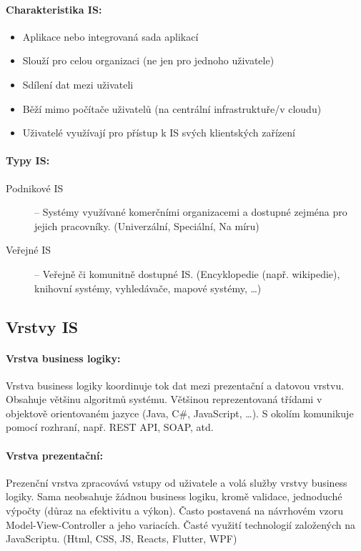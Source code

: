 \paragraph*{Charakteristika IS:}
\begin{itemize}
    \item Aplikace nebo integrovaná sada aplikací
    \item Slouží pro celou organizaci (ne jen pro jednoho uživatele)
    \item Sdílení dat mezi uživateli
    \item Běží mimo počítače uživatelů (na centrální infrastruktuře/v cloudu)
    \item Uživatelé využívají pro přístup k IS svých klientských zařízení
\end{itemize}

\paragraph*{Typy IS:}
\begin{description}
    \item[Podnikové IS] -- Systémy využívané komerčními organizacemi a dostupné zejména pro jejich pracovníky. (Univerzální, Speciální, Na míru)
    \item[Veřejné IS] -- Veřejně či komunitně dostupné IS. (Encyklopedie (např. wikipedie), knihovní systémy, vyhledávače, mapové systémy, …)
\end{description}

\subsection{Vrstvy IS}
\label{sub:vrstvy}
\paragraph*{Vrstva business logiky:}
Vrstva business logiky koordinuje tok dat mezi prezentační a datovou vrstvu. Obsahuje 
většinu algoritmů systému. Většinou reprezentovaná třídami v objektově 
orientovaném jazyce (Java, C\#, JavaScript, …). S okolím komunikuje pomocí 
rozhraní, např. REST API, SOAP, atd.

\paragraph*{Vrstva prezentační:}
Prezenční vrstva zpracovává vstupy od uživatele a volá služby vrstvy 
business logiky. Sama neobsahuje žádnou business logiku, kromě validace, 
jednoduché výpočty (důraz na efektivitu a výkon).
Často postavená na návrhovém vzoru Model-View-Controller a jeho 
variacích. Časté využití technologií založených na JavaScriptu. (Html, CSS, JS, Reacts, Flutter, WPF)

